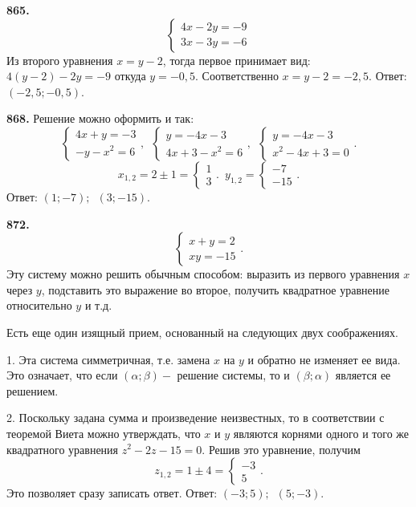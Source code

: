 \textbf{865.}  $$\begin{cases} 4x-2y=-9 \\ 3x-3y=-6 \end{cases}$$ Из второго уравнения $x=y-2$, тогда первое принимает вид: $4(y-2)-2y=-9$ откуда $y=-0,5$. Соответственно $x=y-2=-2,5.$ \newline \null \hspace*{\fill} Ответ: $(-2,5;-0,5)$.             

\newpage \textbf{868.} Решение можно оформить и так:
$$\begin{cases} 4x+y=-3 \\ -y-x^2=6 \end{cases},\enspace\begin{cases} y=-4x-3 \\ 4x+3-x^2=6 \end{cases},\enspace \begin{cases} y=-4x-3 \\ x^2-4x+3=0 \end{cases}.$$ $$x_{1,2}=2\pm1=\begin{cases}1 \\ 3 \end{cases}.\enspace y_{1,2}=\begin{cases}-7 \\ -15 \end{cases}.$$ \newline \null \hspace*{\fill} Ответ: $(1;-7);\enspace(3;-15)$.

\textbf{872.}  $$\begin{cases}x+y=2\\ xy=-15 \end{cases}.$$ Эту систему можно решить обычным способом: выразить  из первого уравнения $x$ через $y$, подставить это выражение во второе, получить квадратное уравнение относительно $y$ и т.д. 

Есть еще один изящный прием, основанный на следующих двух соображениях.  

1. Эта система симметричная, т.е. замена $x$ на $y$ и обратно не изменяет ее вида. Это означает, что если $(\alpha;\beta)-$ решение системы, то и $(\beta;\alpha)$ является ее решением. 

2. Поскольку задана сумма и произведение неизвестных, то в соответствии с теоремой Виета можно утверждать, что $x$ и $y$ являются корнями одного и того же квадратного уравнения  \newline$z^2-2z-15=0$. Решив это уравнение, получим  $$z_{1,2}=1\pm4=\begin{cases}-3\\ 5 \end{cases}.$$ Это позволяет сразу записать ответ. \newline \null \hspace*{\fill} Ответ: $(-3;5);\enspace(5;-3)$.  

